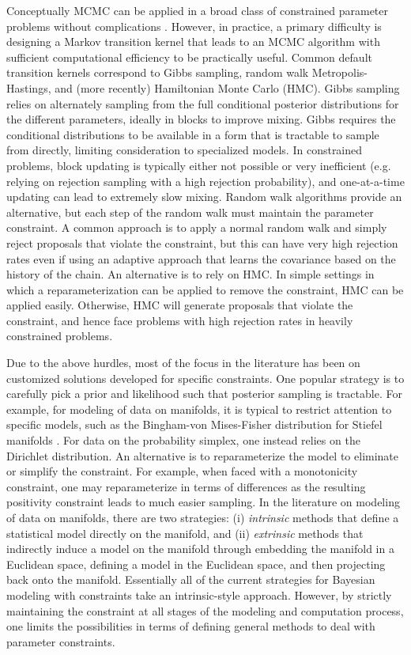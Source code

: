 \documentclass[10pt]{article}
\DeclareMathOperator{\1}{\mathbbm{1}}
\begin{document}
Conceptually MCMC can be applied in a broad class of constrained parameter problems without complications \citep{gelfand1992bayesian}. However, in practice, a primary difficulty is designing a Markov transition kernel that leads to an MCMC algorithm with sufficient computational efficiency to be practically useful. Common default transition kernels correspond to Gibbs sampling, random walk Metropolis-Hastings, and (more recently) Hamiltonian Monte Carlo (HMC). Gibbs sampling relies on alternately sampling from the full conditional posterior distributions for the different parameters, ideally in blocks to improve mixing. Gibbs requires the conditional distributions to be available in a form that is tractable to sample from directly, limiting consideration to specialized models. In constrained problems, block updating is typically either not possible or very inefficient (e.g. relying on rejection sampling with a high rejection probability), and one-at-a-time updating can lead to extremely slow mixing. Random walk algorithms provide an alternative, but each step of the random walk must maintain the parameter constraint. A common approach is to apply a normal random walk and simply reject proposals that violate the constraint, but this can have very high rejection rates even if using an adaptive approach that learns the covariance based on the history of the chain. An alternative is to rely on HMC. In simple settings in which a reparameterization can be applied to remove the constraint, HMC can be applied easily. Otherwise, HMC will generate proposals that violate the constraint, and hence face problems with high rejection rates in heavily constrained problems.

Due to the above hurdles, most of the focus in the literature has been on customized solutions developed for specific constraints.
One popular strategy is to carefully pick a prior and likelihood such that posterior sampling is tractable. For example, for modeling of data on manifolds, it is typical to restrict attention to specific models, such as the Bingham-von Mises-Fisher distribution for Stiefel manifolds \citep{khatri1977mises,hoff2009simulation}. For data on the probability simplex, one instead relies on the Dirichlet distribution. An alternative is to reparameterize the model to eliminate or simplify the constraint. For example, when faced with a monotonicity constraint, one may reparameterize in terms of differences as the resulting positivity constraint leads to much easier sampling. In the literature on modeling of data on manifolds, there are two strategies: (i) {\em intrinsic} methods that define a statistical model directly on the manifold, and (ii) {\em extrinsic} methods that indirectly induce a model on the manifold through embedding the manifold in a Euclidean space, defining a model in the Euclidean space, and then projecting back onto the manifold. Essentially all of the current strategies for Bayesian modeling with constraints take an intrinsic-style approach. However, by strictly maintaining the constraint at all stages of the modeling and computation process, one limits the possibilities in terms of defining general methods to deal with parameter constraints.
\end{document}
